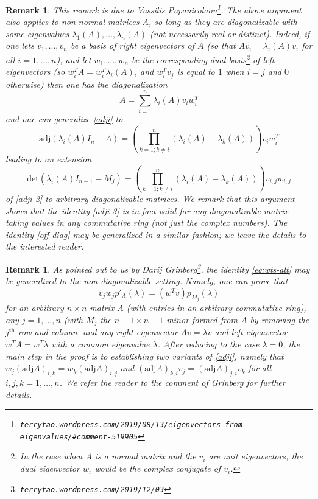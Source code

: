 \documentclass[12pt]{amsart}
\newtheorem{remark}[lemma]{Remark}
\begin{document}
\begin{remark} This remark is due to Vassilis Papanicolaou\footnote{\tt terrytao.wordpress.com/2019/08/13/eigenvectors-from-eigenvalues/\#comment-519905}.  The above argument also applies to non-normal matrices $A$, so long as they are diagonalizable with some eigenvalues $\lambda_1(A),\dots,\lambda_n(A)$ (not necessarily real or distinct).  Indeed, if one lets $v_1,\dots,v_n$ be a basis of right eigenvectors of $A$ (so that $A v_i = \lambda_i(A) v_i$ for all $i=1,\dots,n$), and let $w_1,\dots,w_n$ be the corresponding dual basis\footnote{In the case when $A$ is a normal matrix and the $v_i$ are unit eigenvectors, the dual eigenvector $w_i$ would be the complex conjugate of $v_i$.} of left eigenvectors (so $w_i^T A = w_i^T \lambda_i(A)$, and $w_i^T v_j$ is equal to $1$ when $i=j$ and $0$ otherwise) then one has the diagonalization
$$ A = \sum_{i=1}^n \lambda_i(A) v_i w_i^T$$
and one can generalize \eqref{adji} to
\begin{equation}\label{lia}
 \mathrm{adj}(\lambda_i(A) I_n - A) = (\prod_{k=1; k \neq i}^n (\lambda_i(A) - \lambda_k(A)) ) v_i w_i^T
\end{equation}
leading to an extension
\begin{equation}\label{adji-3}
 \mathrm{det}(\lambda_i(A) I_{n-1} - M_j) = (\prod_{k=1; k \neq i}^n (\lambda_i(A) - \lambda_k(A)) ) v_{i,j} w_{i,j}
\end{equation}
of \eqref{adji-2} to arbitrary diagonalizable matrices.  We remark that this argument shows that the identity \eqref{adji-3} is in fact valid for any diagonalizable matrix taking values in any commutative ring (not just the complex numbers).  The identity \eqref{off-diag} may be generalized in a similar fashion; we leave the details to the interested reader.  
\end{remark}

\begin{remark}\label{grin} As pointed out to us by Darij Grinberg\footnote{{\tt terrytao.wordpress.com/2019/12/03}}, the identity \eqref{eq:wts-alt} may be generalized to the non-diagonalizable setting.  Namely, one can prove that
$$ v_j w_j p'_A(\lambda) = (w^T v) p_{M_j}(\lambda)$$
for an arbitrary $n \times n$ matrix $A$ (with entries in an arbitrary commutative ring), any $j=1,\dots,n$ (with $M_j$ the $n-1 \times n-1$ minor formed from $A$ by removing the $j^{\mathrm{th}}$ row and column, and any right-eigenvector $Av = \lambda v$ and left-eigenvector $w^T A = w^T \lambda$ with a common eigenvalue $\lambda$.  After reducing to the case $\lambda=0$, the main step in the proof is to establishing two variants of \eqref{adji}, namely that $w_j (\mathrm{adj} A)_{i,k} = w_k (\mathrm{adj} A)_{i,j}$ and $(\mathrm{adj} A)_{k,i} v_j = (\mathrm{adj} A)_{j,i} v_k$ for all $i,j,k=1,\dots,n$. We refer the reader to the comment of Grinberg for further details.
\end{remark}
\end{document}
